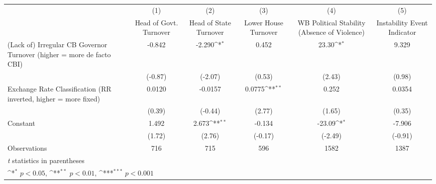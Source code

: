 {
\def\sym#1{\ifmmode^{#1}\else\(^{#1}\)\fi}
\begin{tabular*}{\linewidth}{@{\hskip\tabcolsep\extracolsep\fill}l*{5}{c}}
\toprule
                &\multicolumn{1}{c}{(1)}&\multicolumn{1}{c}{(2)}&\multicolumn{1}{c}{(3)}&\multicolumn{1}{c}{(4)}&\multicolumn{1}{c}{(5)}\\
                &\multicolumn{1}{c}{Head of Govt. Turnover}&\multicolumn{1}{c}{Head of State Turnover}&\multicolumn{1}{c}{Lower House Turnover}&\multicolumn{1}{c}{WB Political Stability (Absence of Violence)}&\multicolumn{1}{c}{Instability Event Indicator}\\
\midrule
(Lack of) Irregular CB Governor Turnover (higher = more de facto CBI)&   -0.842         &   -2.290\sym{*}  &    0.452         &    23.30\sym{*}  &    9.329         \\
                &  (-0.87)         &  (-2.07)         &   (0.53)         &   (2.43)         &   (0.98)         \\
\addlinespace
Exchange Rate Classification (RR inverted, higher = more fixed)&   0.0120         &  -0.0157         &   0.0775\sym{**} &    0.252         &   0.0354         \\
                &   (0.39)         &  (-0.44)         &   (2.77)         &   (1.65)         &   (0.35)         \\
\addlinespace
Constant        &    1.492         &    2.673\sym{**} &   -0.134         &   -23.09\sym{*}  &   -7.906         \\
                &   (1.72)         &   (2.76)         &  (-0.17)         &  (-2.49)         &  (-0.91)         \\
\midrule
Observations    &      716         &      715         &      596         &     1582         &     1387         \\
\bottomrule
\multicolumn{6}{l}{\footnotesize \textit{t} statistics in parentheses}\\
\multicolumn{6}{l}{\footnotesize \sym{*} \(p<0.05\), \sym{**} \(p<0.01\), \sym{***} \(p<0.001\)}\\
\end{tabular*}
}
